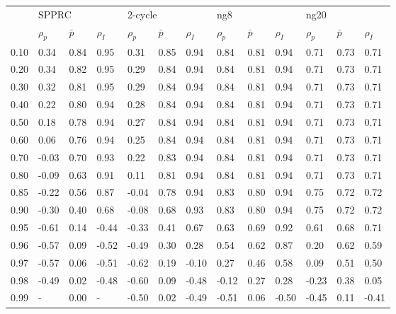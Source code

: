 \begin{tabular}{lllllllllllll}
\toprule
{} & \multicolumn{3}{l}{SPPRC} & \multicolumn{3}{l}{2-cycle} & \multicolumn{3}{l}{ng8} & \multicolumn{3}{l}{ng20} \\
{} & $\rho_p$ & $\bar p$ & $\rho_I$ & $\rho_p$ & $\bar p$ & $\rho_I$ & $\rho_p$ & $\bar p$ & $\rho_I$ & $\rho_p$ & $\bar p$ & $\rho_I$ \\
\midrule
0.10 &     0.34 &     0.84 &     0.95 &     0.31 &     0.85 &     0.94 &     0.84 &     0.81 &     0.94 &     0.71 &     0.73 &     0.71 \\
0.20 &     0.34 &     0.82 &     0.95 &     0.29 &     0.84 &     0.94 &     0.84 &     0.81 &     0.94 &     0.71 &     0.73 &     0.71 \\
0.30 &     0.32 &     0.81 &     0.95 &     0.29 &     0.84 &     0.94 &     0.84 &     0.81 &     0.94 &     0.71 &     0.73 &     0.71 \\
0.40 &     0.22 &     0.80 &     0.94 &     0.28 &     0.84 &     0.94 &     0.84 &     0.81 &     0.94 &     0.71 &     0.73 &     0.71 \\
0.50 &     0.18 &     0.78 &     0.94 &     0.27 &     0.84 &     0.94 &     0.84 &     0.81 &     0.94 &     0.71 &     0.73 &     0.71 \\
0.60 &     0.06 &     0.76 &     0.94 &     0.25 &     0.84 &     0.94 &     0.84 &     0.81 &     0.94 &     0.71 &     0.73 &     0.71 \\
0.70 &    -0.03 &     0.70 &     0.93 &     0.22 &     0.83 &     0.94 &     0.84 &     0.81 &     0.94 &     0.71 &     0.73 &     0.71 \\
0.80 &    -0.09 &     0.63 &     0.91 &     0.11 &     0.81 &     0.94 &     0.84 &     0.81 &     0.94 &     0.71 &     0.73 &     0.71 \\
0.85 &    -0.22 &     0.56 &     0.87 &    -0.04 &     0.78 &     0.94 &     0.83 &     0.80 &     0.94 &     0.75 &     0.72 &     0.72 \\
0.90 &    -0.30 &     0.40 &     0.68 &    -0.08 &     0.68 &     0.93 &     0.83 &     0.80 &     0.94 &     0.75 &     0.72 &     0.72 \\
0.95 &    -0.61 &     0.14 &    -0.44 &    -0.33 &     0.41 &     0.67 &     0.63 &     0.69 &     0.92 &     0.61 &     0.68 &     0.71 \\
0.96 &    -0.57 &     0.09 &    -0.52 &    -0.49 &     0.30 &     0.28 &     0.54 &     0.62 &     0.87 &     0.20 &     0.62 &     0.59 \\
0.97 &    -0.57 &     0.06 &    -0.51 &    -0.62 &     0.19 &    -0.10 &     0.27 &     0.46 &     0.58 &     0.09 &     0.51 &     0.50 \\
0.98 &    -0.49 &     0.02 &    -0.48 &    -0.60 &     0.09 &    -0.48 &    -0.12 &     0.27 &     0.28 &    -0.23 &     0.38 &     0.05 \\
0.99 &        - &     0.00 &        - &    -0.50 &     0.02 &    -0.49 &    -0.51 &     0.06 &    -0.50 &    -0.45 &     0.11 &    -0.41 \\
\bottomrule
\end{tabular}
